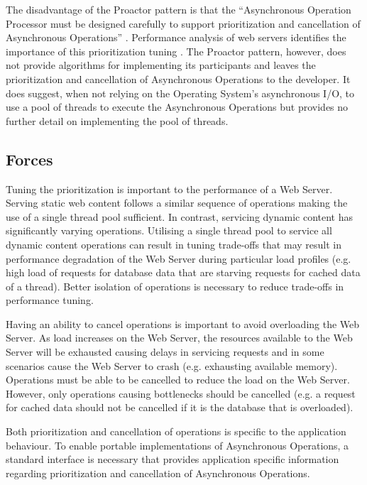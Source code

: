 \documentclass[prodmode]{style/acmlarge}
\begin{document}
The disadvantage of the Proactor pattern is that the ``Asynchronous Operation
Processor must be designed carefully to support prioritization and cancellation
of Asynchronous Operations'' \cite[p. 8]{proactor}.  Performance analysis of web
servers identifies the importance of this prioritization tuning
\cite{tuning-important,low-server-footprint,tuning-os-important}. The Proactor
pattern, however, does not provide algorithms for implementing its participants
and leaves the prioritization and cancellation of Asynchronous Operations to the
developer.  It does suggest, when not relying on the Operating System's
asynchronous I/O, to use a pool of threads to execute the Asynchronous
Operations but provides no further detail on implementing the pool of threads.


\subsection{Forces}

Tuning the prioritization is important to the performance of a Web Server.
Serving static web content follows a similar sequence of operations making the
use of a single thread pool sufficient.  In contrast, servicing dynamic content
has significantly varying operations.  Utilising a single thread pool to service
all dynamic content operations can result in tuning trade-offs that may result
in performance degradation of the Web Server during particular load profiles
(e.g. high load of requests for database data that are starving requests for
cached data of a thread).  Better isolation of operations is necessary to reduce
trade-offs in performance tuning.

Having an ability to cancel operations is important to avoid overloading the Web
Server.  As load increases on the Web Server, the resources available to the Web
Server will be exhausted causing delays in servicing requests and in some
scenarios cause the Web Server to crash (e.g. exhausting available memory). 
Operations must be able to be cancelled to reduce the load on the Web Server. 
However, only operations causing bottlenecks should be cancelled (e.g. a request
for cached data should not be cancelled if it is the database that is
overloaded).

Both prioritization and cancellation of operations is specific to the
application behaviour.  To enable portable implementations of Asynchronous
Operations, a standard interface is necessary that provides application specific
information regarding prioritization and cancellation of Asynchronous
Operations.
\end{document}
